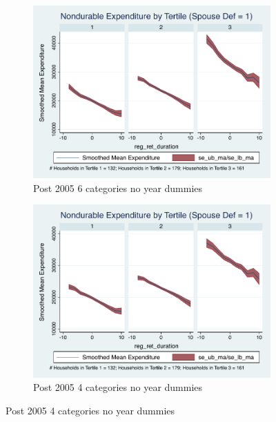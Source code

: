 \documentclass[11pt,onecolumn]{article}
\numberwithin{figure}{section}
\begin{document}
\begin{figure}
  \begin{subfigure}{0.5\textwidth}
  \centering
 	\includegraphics[width=0.9\linewidth]{../ConsumptionPostRetirement_by_SpouseDef/Smoothed_xhealth/post_2005/six_cats/spouse_def_noyeard_1.pdf}
    \caption{Post 2005 6 categories no year dummies}
    \label{fig:chapter001_dist_001}
  \end{subfigure}
  	\hspace{1cm}
  \begin{subfigure}{0.5\textwidth}
 	\includegraphics[width=0.9\linewidth]{../ConsumptionPostRetirement_by_SpouseDef/Smoothed_xhealth_educ/post_2005/six_cats/spouse_def_noyeard_1.pdf}
    \caption{Post 2005 4 categories no year dummies}
    \label{fig:chapter001_reward_001}
  \end{subfigure}
  
\end{figure}
\clearpage
\end{document}
